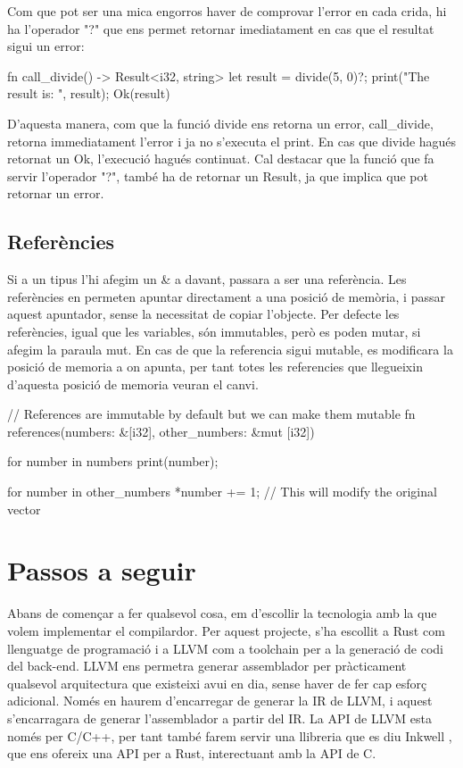 ﻿\documentclass{article}
\begin{document}
Com que pot ser una mica engorros haver de comprovar l'error en cada crida, hi
ha l'operador "?" que ens permet retornar imediatament en cas que el resultat
sigui un error:

\begin{code}
fn call_divide() -> Result<i32, string> {
    let result = divide(5, 0)?;
    print("The result is: ", result);
    Ok(result)
}
\end{code}

D'aquesta manera, com que la funció divide ens retorna un error, call\_divide,
retorna immediatament l'error i ja no s'executa el print. En cas que divide hagués
retornat un Ok, l'execució hagués continuat. Cal destacar que la funció que 
fa servir l'operador "?", també ha de retornar un Result, ja que implica que pot
retornar un error.

\subsection{Referències}

Si a un tipus l'hi afegim un {\ttfamily \&} a davant, passara a ser una referència. Les 
referències en permeten apuntar directament a una posició de memòria, i passar
aquest apuntador, sense la necessitat de copiar l'objecte. Per defecte les
referències, igual que les variables, són immutables, però es poden mutar, si 
afegim la paraula mut. En cas de que la referencia sigui mutable, es modificara
la posició de memoria a on apunta, per tant totes les referencies que llegueixin
d'aquesta posició de memoria veuran el canvi.

\begin{code}
// References are immutable by default but we can make them mutable
fn references(numbers: &[i32], other_numbers: &mut [i32]) {
    for number in numbers {
        print(number);
    }

    for number in other_numbers {
        *number += 1; // This will modify the original vector
    }
}
\end{code}

\section{Passos a seguir}

Abans de començar a fer qualsevol cosa, em d'escollir la tecnologia amb la que
volem implementar el compilardor. Per aquest projecte, s'ha escollit a Rust com
llenguatge de programació i a LLVM \cite{llvm_website} com a toolchain per a la generació de codi
del back-end. LLVM ens permetra generar assemblador per pràcticament qualsevol
arquitectura que existeixi avui en dia, sense haver de fer cap esforç adicional.
Només en haurem d'encarregar de generar la IR de LLVM, i aquest s'encarragara de
generar l'assemblador a partir del IR. La API de LLVM esta només per C/C++, per
tant també farem servir una llibreria que es diu Inkwell \cite{inkwell}, que ens ofereix una
API per a Rust, interectuant amb la API de C.
\end{document}
